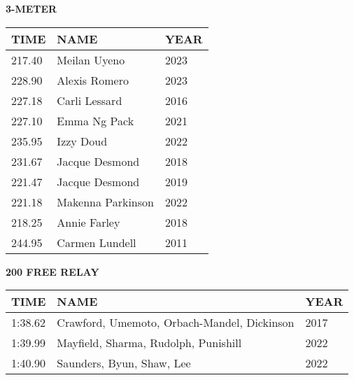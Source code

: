 \vspace{0.4cm}

\begin{center}
\begin{minipage}[t]{0.7\textwidth}
\centering
\textbf{3-METER}\\[0.05cm]
\begin{tabular}{@{}p{1.8cm}p{2.8cm}p{1.2cm}@{}}
\hline
\textbf{TIME} & \textbf{NAME} & \textbf{YEAR} \\
\hline
217.40 & Meilan Uyeno & 2023 \\
228.90 & Alexis Romero & 2023 \\
227.18 & Carli Lessard & 2016 \\
227.10 & Emma Ng Pack & 2021 \\
235.95 & Izzy Doud & 2022 \\
231.67 & Jacque Desmond & 2018 \\
221.47 & Jacque Desmond & 2019 \\
221.18 & Makenna Parkinson & 2022 \\
218.25 & Annie Farley & 2018 \\
244.95 & Carmen Lundell & 2011 \\
\hline
\end{tabular}
\end{minipage}
\end{center}

\vspace{0.4cm}

\begin{center}
\begin{minipage}[t]{0.7\textwidth}
\centering
\textbf{200 FREE RELAY}\\[0.05cm]
\begin{tabular}{@{}p{1.8cm}p{2.8cm}p{1.2cm}@{}}
\hline
\textbf{TIME} & \textbf{NAME} & \textbf{YEAR} \\
\hline
1:38.62 & Crawford, Umemoto, Orbach-Mandel, Dickinson & 2017 \\
1:39.99 & Mayfield, Sharma, Rudolph, Punishill & 2022 \\
1:40.90 & Saunders, Byun, Shaw, Lee & 2022 \\
\hline
\end{tabular}
\end{minipage}
\end{center}

\vspace{0.4cm}

